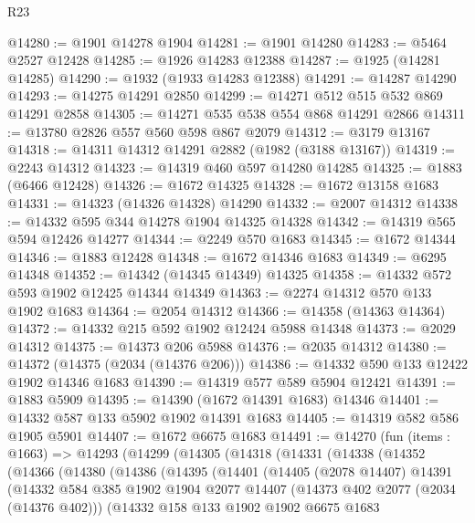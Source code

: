 \begin{lexlean}{R23}
\begin{coremodule}
@14280 := @1901 @14278 @1904
@14281 := @1901 @14280
@14283 := @5464 @2527 @12428
@14285 := @1926 @14283 @12388
@14287 := @1925 (@14281 @14285)
@14290 := @1932 (@1933 @14283 @12388)
@14291 := @14287 @14290
@14293 := @14275 @14291 @2850
@14299 := @14271 @512 @515 @532 @869 @14291 @2858
@14305 := @14271 @535 @538 @554 @868 @14291 @2866
@14311 := @13780 @2826 @557 @560 @598 @867 @2079
@14312 := @3179 @13167
@14318 := @14311 @14312 @14291 @2882 (@1982 (@3188 @13167))
@14319 := @2243 @14312
@14323 := @14319 @460 @597 @14280 @14285
@14325 := @1883 (@6466 @12428)
@14326 := @1672 @14325
@14328 := @1672 @13158 @1683
@14331 := @14323 (@14326 @14328) @14290
@14332 := @2007 @14312
@14338 := @14332 @595 @344 @14278 @1904 @14325 @14328
@14342 := @14319 @565 @594 @12426 @14277
@14344 := @2249 @570 @1683
@14345 := @1672 @14344
@14346 := @1883 @12428
@14348 := @1672 @14346 @1683
@14349 := @6295 @14348
@14352 := @14342 (@14345 @14349) @14325
@14358 := @14332 @572 @593 @1902 @12425 @14344 @14349
@14363 := @2274 @14312 @570 @133 @1902 @1683
@14364 := @2054 @14312
@14366 := @14358 (@14363 @14364)
@14372 := @14332 @215 @592 @1902 @12424 @5988 @14348
@14373 := @2029 @14312
@14375 := @14373 @206 @5988
@14376 := @2035 @14312
@14380 := @14372 (@14375 (@2034 (@14376 @206)))
@14386 := @14332 @590 @133 @12422 @1902 @14346 @1683
@14390 := @14319 @577 @589 @5904 @12421
@14391 := @1883 @5909
@14395 := @14390 (@1672 @14391 @1683) @14346
@14401 := @14332 @587 @133 @5902 @1902 @14391 @1683
@14405 := @14319 @582 @586 @1905 @5901
@14407 := @1672 @6675 @1683
@14491 := @14270
    (fun (items : @1663) =>
    @14293
      (@14299
        (@14305
          (@14318
            (@14331
              (@14338
                (@14352
                  (@14366
                    (@14380
                      (@14386
                        (@14395
                          (@14401
                            (@14405
                              (@2078 @14407)
                              @14391
                              (@14332
                                @584
                                @385
                                @1902
                                @1904
                                @2077
                                @14407
                                (@14373 @402 @2077 (@2034 (@14376 @402)))
                                (@14332
                                  @158
                                  @133
                                  @1902
                                  @1902
                                  @6675
                                  @1683

\end{coremodule}
\end{lexlean}
